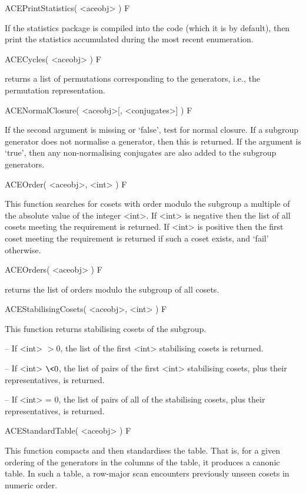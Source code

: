 \>ACEPrintStatistics( <aceobj> ) F

If the statistics package is compiled into the code (which it is by
default),
then print the statistics accumulated during the most recent enumeration.



\>ACECycles( <aceobj> ) F

returns a list of permutations corresponding to the generators,
i.e., the permutation representation.

\>ACENormalClosure( <aceobj>[, <conjugates>] ) F

If the second argument is missing or `false', test for normal closure.
If a subgroup  generator  does not  normalise  a  generator,  then this  is
returned.
If  the  argument  is `true',  then  any  non-normalising
conjugates are also added to the subgroup generators.

\>ACEOrder( <aceobj>, <int> ) F

This function searches for cosets with order modulo the subgroup a multiple
of the absolute value of the integer <int>.
If <int> is negative then the list of all cosets meeting the requirement is
returned.
If <int> is positive then the first coset meeting the requirement is
returned if such a coset exists, and `fail' otherwise.

\>ACEOrders( <aceobj> ) F

returns the list of orders modulo the subgroup of all cosets.


\>ACEStabilisingCosets( <aceobj>, <int> ) F

This function returns stabilising cosets of the subgroup.

\beginlist
\item{--} If <int> $> 0$, the list of the first <int> stabilising cosets
    is returned.
\item{--} If <int> $\< 0$, the list of pairs of the first <int> stabilising
    cosets, plus their representatives, is returned.
\item{--} If <int> = $0$, the list of pairs of all of the stabilising cosets,
    plus their representatives, is returned.
\endlist


\>ACEStandardTable( <aceobj> ) F

This function compacts and then standardises the table.
That is, for a given ordering of the generators in the columns of the
table, it produces a canonic table.
In such a table, a row-major scan encounters previously unseen cosets in
numeric order.

